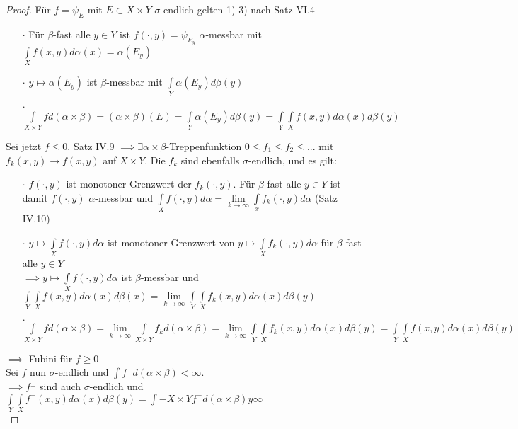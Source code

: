   \begin{proof}
    Für $f = \psi_E$ mit $E\subset X\times Y$ $\sigma$-endlich gelten 1)-3) nach Satz VI.4
    \begin{itemize}
    	\item[$\cdot$] Für $\beta$-fast alle $y\in Y$ ist $f(\cdot, y) = \psi_{E_y}$ $\alpha$-messbar mit $\int\limits_X f(x,y) d\alpha(x) = \alpha(E_y)$
    	\item[$\cdot$] $y \mapsto \alpha(E_y)$ ist $\beta$-messbar mit $\int\limits_Y \alpha(E_y) d\beta(y)$ 
    	\item[$\cdot$] $\int\limits_{X\times Y} f d(\alpha\times\beta) = (\alpha\times\beta)(E) = \int\limits_Y \alpha(E_y)d\beta(y) = \int\limits_Y \int\limits_X f(x,y) d\alpha(x) d\beta(y)$
    \end{itemize}
	Sei jetzt $f\leq 0$. Satz IV.9 $\implies \exists \alpha\times\beta$-Treppenfunktion $0 \leq f_1 \leq f_2 \leq ...$ mit $f_k(x,y) \to f(x,y)$ auf $X\times Y$. Die $f_k$ sind ebenfalls $\sigma$-endlich, und es gilt: 
	\begin{itemize}
		\item[$\cdot$] $f(\cdot, y)$ ist monotoner Grenzwert der $f_k(\cdot, y)$. Für $\beta$-fast alle $y\in Y$ ist damit $f(\cdot, y)$ $\alpha$-messbar und $\int\limits_X f(\cdot, y)d\alpha = \lim\limits_{k\to\infty} \int\limits_x f_k(\cdot, y) d\alpha$ (Satz IV.10)
		\item[$\cdot$] $y \mapsto \int\limits_X f(\cdot, y) d\alpha$ ist monotoner Grenzwert von $y\mapsto \int\limits_X f_k(\cdot, y) d\alpha$ für $\beta$-fast alle $y\in Y$\\ $\implies y\mapsto \int\limits_X f(\cdot, y) d\alpha$ ist $\beta$-messbar und $\int\limits_Y \int\limits_X f(x,y)d\alpha(x) d\beta(x) = \lim\limits_{k\to\infty}\int\limits_Y \int\limits_X f_k(x,y) d\alpha(x) d\beta(y)$
		\item[$\cdot$] $\int\limits_{X\times Y} f d(\alpha\times\beta) = \lim\limits_{k\to\infty}\int\limits_{X\times Y} f_k d(\alpha\times\beta) = \lim\limits_{k\to\infty}\int\limits_Y\int\limits_X f_k (x,y) d\alpha(x) d\beta(y) = \int\limits_Y \int\limits_X f(x,y) d\alpha(x) d\beta(y) $
	\end{itemize}
	$\implies$ Fubini für $f\geq 0$ \\
	Sei $f$ nun $\sigma$-endlich und $\int f^- d(\alpha\times\beta) < \infty$. \\
	$\implies f^\pm$ sind auch $\sigma$-endlich und $\int\limits_Y \int\limits_X f^-(x,y) d\alpha(x) d\beta(y) = \int\limits-{X\times Y} f^- d(\alpha\times\beta) y\infty$ \\

\end{proof}
